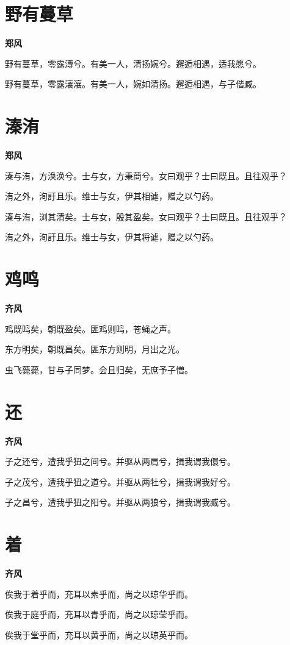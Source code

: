 \documentclass[12pt,a4paper]{ctexbook}
\begin{document}
\section{野有蔓草}
\textbf{郑风}\par\vspace{0.5em}
野有蔓草，零露漙兮。有美一人，清扬婉兮。邂逅相遇，适我愿兮。\par
野有蔓草，零露瀼瀼。有美一人，婉如清扬。邂逅相遇，与子偕臧。\par

\section{溱洧}
\textbf{郑风}\par\vspace{0.5em}
溱与洧，方涣涣兮。士与女，方秉蕳兮。女曰观乎？士曰既且。且往观乎？\par
洧之外，洵訏且乐。维士与女，伊其相谑，赠之以勺药。\par
溱与洧，浏其清矣。士与女，殷其盈矣。女曰观乎？士曰既且。且往观乎？\par
洧之外，洵訏且乐。维士与女，伊其将谑，赠之以勺药。\par

\section{鸡鸣}
\textbf{齐风}\par\vspace{0.5em}
鸡既鸣矣，朝既盈矣。匪鸡则鸣，苍蝇之声。\par
东方明矣，朝既昌矣。匪东方则明，月出之光。\par
虫飞薨薨，甘与子同梦。会且归矣，无庶予子憎。\par

\section{还}
\textbf{齐风}\par\vspace{0.5em}
子之还兮，遭我乎狃之间兮。并驱从两肩兮，揖我谓我儇兮。\par
子之茂兮，遭我乎狃之道兮。并驱从两牡兮，揖我谓我好兮。\par
子之昌兮，遭我乎狃之阳兮。并驱从两狼兮，揖我谓我臧兮。\par

\section{着}
\textbf{齐风}\par\vspace{0.5em}
俟我于着乎而，充耳以素乎而，尚之以琼华乎而。\par
俟我于庭乎而，充耳以青乎而，尚之以琼莹乎而。\par
俟我于堂乎而，充耳以黄乎而，尚之以琼英乎而。\par
\end{document}
